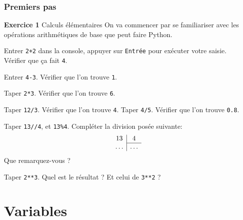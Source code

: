\documentclass[10pt]{beamer}
\begin{document}
\begin{frame}[fragile]
	\frametitle{Premiers pas}
	\begin{block}{\textbf{Exercice 1} Calculs élémentaires}
		On va commencer par se familiariser avec les opérations arithmétiques de base que peut faire Python.
		
		\begin{description}[<+->]
		\item[Addition] Entrer \verb|2+2| dans la console, appuyer sur \verb|Entrée| pour exécuter votre saisie. Vérifier que ça fait \verb|4|.
		\item[Soustraction] Entrer \verb|4-3|. Vérifier que l'on trouve \verb|1|.
		\item[Produit] Taper \verb|2*3|. Vérifier que l'on trouve \verb|6|.
		\item[Division] Taper \verb|12/3|. Vérifier que l'on trouve \verb|4|. Taper \verb|4/5|. Vérifier que l'on trouve \verb|0.8|.
		\item[...de CM1] Taper \verb|13//4|, et \verb|13%4|. Compléter la division posée suivante:
			\[
			\begin{array}{c|c}
			13      & 4\\ \cline{2-2}
			\ldots  & \ldots
			\end{array}
			 \]
			Que remarquez-vous ?
		\item[Puissances] Taper \verb|2**3|. Quel est le résultat ? Et celui de \verb|3**2| ?
		\end{description}
	\end{block}
\end{frame}

\section{Variables}
\end{document}
